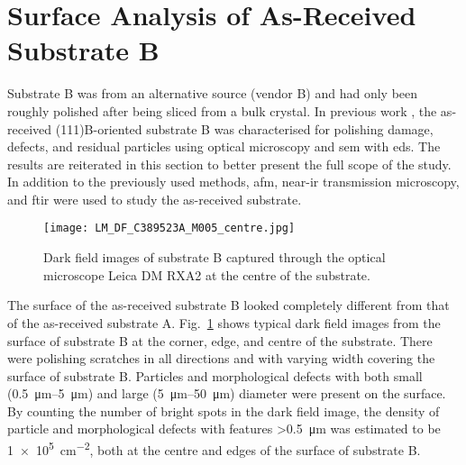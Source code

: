 \clearpage
\section{Surface Analysis of As-Received Substrate B}\label{sec:subBa}
Substrate B was from an alternative source (vendor B) and had only been roughly polished after being sliced from a bulk crystal. In previous work \citep{lauten2017characterisation}, the as-received (111)B-oriented substrate B was characterised for polishing damage, defects, and residual particles using optical microscopy and \ac{sem} with \ac{eds}. The results are reiterated in this section to better present the full scope of the study. In addition to the previously used methods, \ac{afm}, near-\ac{ir} transmission microscopy, and \ac{ftir} were used to study the as-received substrate.

\begin{figure}[htbp]
    \centering
    \texttt{[image: LM\_DF\_C389523A\_M005\_centre.jpg]}
    \caption[Dark field images of substrate B.]{Dark field images of substrate B captured through the optical microscope Leica DM RXA2 at the centre of the substrate.}%
    \label{fig:subBa_om_df}
\end{figure}

The surface of the as-received substrate B looked completely different from that of the as-received substrate A. Fig.~\ref{fig:subBa_om_df} shows typical dark field images from the surface of substrate B at the corner, edge, and centre of the substrate. There were polishing scratches in all directions and with varying width covering the surface of substrate B. Particles and morphological defects with both small (\SIrange{0.5}{5}{\micro\metre}) and large (\SIrange{5}{50}{\micro\metre}) diameter were present on the surface. By counting the number of bright spots in the dark field image, the density of particle and morphological defects with features \SI{>0.5}{\micro\metre} was estimated to be \SI{1e5}{\centi\metre^{-2}}, both at the centre and edges of the surface of substrate B.

